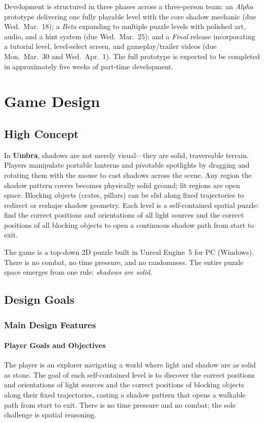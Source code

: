 \documentclass[11pt, letterpaper]{article}
\begin{document}
Development is structured in three phases across a three-person team: an \emph{Alpha}
prototype delivering one fully playable level with the core shadow mechanic
(due Wed.~Mar.~18); a \emph{Beta} expanding to multiple puzzle levels with
polished art, audio, and a hint system (due Wed.~Mar.~25); and a \emph{Final} release
incorporating a tutorial level, level-select screen, and gameplay/trailer videos (due
Mon.~Mar.~30 and Wed.~Apr.~1). The full prototype is expected to be completed in
approximately five weeks of part-time development.

\section{Game Design}

    \subsection{High Concept}
    In \textbf{Umbra}, shadows are not merely visual---they are solid, traversable
    terrain. Players manipulate portable lanterns and pivotable spotlights by dragging
    and rotating them with the mouse to cast shadows across the scene. Any region the
    shadow pattern covers becomes physically solid ground; lit regions are open space.
    Blocking objects (crates, pillars) can be slid along fixed trajectories to redirect
    or reshape shadow geometry. Each level is a self-contained spatial puzzle: find the
    correct positions and orientations of all light sources and the correct positions of
    all blocking objects to open a continuous shadow path from start to exit.

    The game is a top-down 2D puzzle built in Unreal Engine~5 for PC (Windows). There is
    no combat, no time pressure, and no randomness. The entire puzzle space emerges from
    one rule: \emph{shadows are solid}.

    \subsection{Design Goals}

        \subsubsection{Main Design Features}

            \paragraph{Player Goals and Objectives}
            The player is an explorer navigating a world where light and shadow are as
            solid as stone. The goal of each self-contained level is to discover the
            correct positions and orientations of light sources and the correct positions
            of blocking objects along their fixed trajectories, casting a shadow pattern
            that opens a walkable path from start to exit. There is no time pressure and no combat; the sole
            challenge is spatial reasoning.
\end{document}
